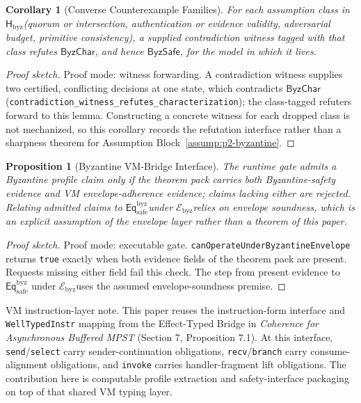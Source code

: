 \documentclass[a4paper,10pt,twocolumn,english]{article}
\numberwithin{equation}{section}
\theoremstyle{paperdef}
\theoremstyle{paperplain}
\newtheorem{proposition}[definition]{Proposition}
\newtheorem{corollary}[definition]{Corollary}
\theoremstyle{paperdef}
\theoremstyle{paperremark}
\newcommand{\Hbyz}{\ensuremath{\mathsf{H}_{\mathrm{byz}}}}
\newcommand{\Eqsafe}{\ensuremath{\mathsf{Eq}_{\mathrm{safe}}^{\mathrm{byz}}}}
\newcommand{\Ebyz}{\ensuremath{\mathcal{E}_{\mathrm{byz}}}}
\newcommand{\ByzSafe}{\ensuremath{\mathsf{ByzSafe}}}
\newcommand{\ByzChar}{\ensuremath{\mathsf{ByzChar}}}
\begin{document}
\begin{corollary}[Converse Counterexample Families]
	\label{cor:converse}
	For each assumption class in \Hbyz (quorum or intersection, authentication or evidence validity, adversarial budget, primitive consistency), a supplied contradiction witness tagged with that class refutes $\ByzChar$, and hence $\ByzSafe$, for the model in which it lives.
\end{corollary}

\begin{proof}[Proof sketch]
	Proof mode: witness forwarding.
	A contradiction witness supplies two certified, conflicting decisions at one
	state, which contradicts $\ByzChar$
	(\nolinkurl{contradiction_witness_refutes_characterization}); the
	class-tagged refuters forward to this lemma. Constructing a concrete
	witness for each dropped class is not mechanized, so this corollary
	records the refutation interface rather than a sharpness theorem for
	Assumption Block~\ref{assump:p2-byzantine}.
\end{proof}

\begin{proposition}[Byzantine VM-Bridge Interface]
	\label{prop:vm-bridge}
	The runtime gate admits a Byzantine profile claim only if the theorem pack carries both Byzantine-safety evidence and VM envelope-adherence evidence; claims lacking either are rejected. Relating admitted claims to \Eqsafe under \Ebyz relies on envelope soundness, which is an explicit assumption of the envelope layer rather than a theorem of this paper.
\end{proposition}

\begin{proof}[Proof sketch]
	Proof mode: executable gate.
	\texttt{canOperateUnderByzantineEnvelope} returns \texttt{true} exactly
	when both evidence fields of the theorem pack are present. Requests missing
	either field fail this check. The step from present evidence to \Eqsafe
	under \Ebyz uses the assumed envelope-soundness premise.
\end{proof}

VM instruction-layer note. This paper reuses the instruction-form interface and \texttt{WellTypedInstr} mapping from the Effect-Typed Bridge in \emph{Coherence for Asynchronous Buffered MPST} (Section 7, Proposition 7.1). At this interface, \texttt{send}/\texttt{select} carry sender-continuation obligations, \texttt{recv}/\texttt{branch} carry consume-alignment obligations, and \texttt{invoke} carries handler-fragment lift obligations. The contribution here is computable profile extraction and safety-interface packaging on top of that shared VM typing layer.
\end{document}
